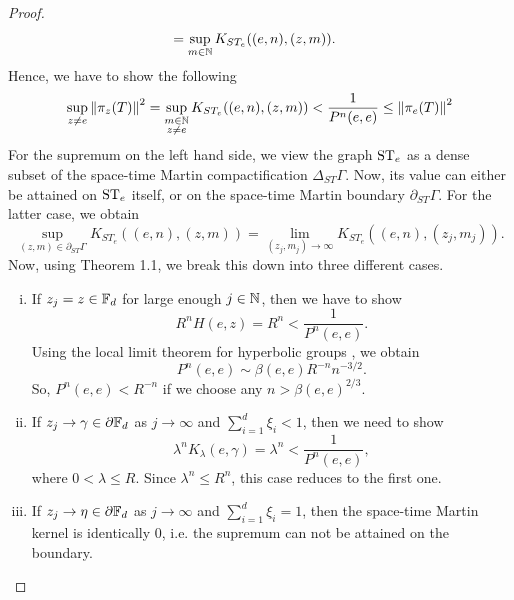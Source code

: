 \documentclass[12pt, class = article, crop = false, a4paper, twoside]{standalone}
\begin{document}
\begin{proof}
\begin{equation*}
\begin{split}
            & = \sup_{m\in\mathbb{N}}K_{ST_{e}}((e, n), (z, m)).
        \end{split}
    \end{equation*}
    Hence, we have to show the following
    \begin{equation*}
        \sup_{z\neq e}\left\|\pi_{z}(T)\right\|^{2} = \sup_{\substack{m\in\mathbb{N} \\ z\neq e}}K_{ST_{e}}((e, n), (z, m)) < \dfrac{1}{P^{n}(e, e)} \leq \left\|\pi_{e}(T)\right\|^{2}
    \end{equation*}
    For the supremum on the left hand side, we view the graph $\operatorname{ST}_{e}$ as a dense subset of the space-time Martin compactification $\Delta_{ST}\Gamma$. Now, its value can either be attained on $\operatorname{ST}_{e}$ itself, or on the space-time Martin boundary $\partial_{ST}\Gamma$. For the latter case, we obtain 
    \begin{equation*}
        \sup_{(z, m)\in\partial_{ST}\Gamma}K_{ST_{e}}((e, n), (z, m)) = \lim_{(z_{j}, m_{j})\to\infty}K_{ST_{e}}((e, n), (z_{j}, m_{j})).
    \end{equation*}
    Now, using Theorem 1.1, we break this down into three different cases.
    \begin{enumerate}[(i)]
        \item If $z_{j} = z\in\mathbb{F}_{d}$ for large enough $j\in\mathbb{N}$, then we have to show
            \begin{equation*}
                R^{n}H(e, z) = R^{n} < \dfrac{1}{P^{n}(e, e)}.
            \end{equation*}
        Using the local limit theorem for hyperbolic groups \cite[Theorem 1.1]{GOSE14}, we obtain
            \begin{equation*}
                P^{n}(e, e) \sim \beta(e, e)R^{-n}n^{-3/2}.
            \end{equation*}
        So, $P^{n}(e, e) < R^{-n}$ if we choose any $n > \beta(e, e)^{2/3}$.
        \item If $z_{j}\to\gamma\in\partial\mathbb{F}_{d}$ as $j\to\infty$ and $\sum^{d}_{i = 1}\xi_{i} < 1$, then we need to show
            \begin{equation*}
                \lambda^{n}K_{\lambda}(e, \gamma) = \lambda^{n} < \dfrac{1}{P^{n}(e, e)},
            \end{equation*}
        where $0 < \lambda \leq R$. Since $\lambda^{n} \leq R^{n}$, this case reduces to the first one.
        \item If $z_{j}\to\eta\in\partial\mathbb{F}_{d}$ as $j\to\infty$ and $\sum^{d}_{i = 1}\xi_{i} = 1$, then 
        the space-time Martin kernel is identically $0$, i.e. the supremum can not be attained on the boundary.
    \end{enumerate}


\end{proof}
\end{document}
